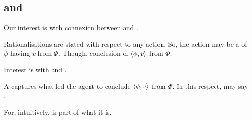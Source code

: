 \subsection{ and }


\begin{note}
  Our interest is with connexion between  and .

  Rationalisations are stated with respect to any action.
  So, the action may be a \evalion{} of \(\phi\) having  \(v\) from \(\Phi\).
  Though, conclusion of \(\langle\phi, v\rangle\) from \(\Phi\).

  Interest is with  and .

  A \fofr{} captures what led the agent to conclude \(\langle\phi, v\rangle\) from \(\Phi\).
  In this respect, may say .

  For, intuitively,  is part of what it is.
\end{note}

